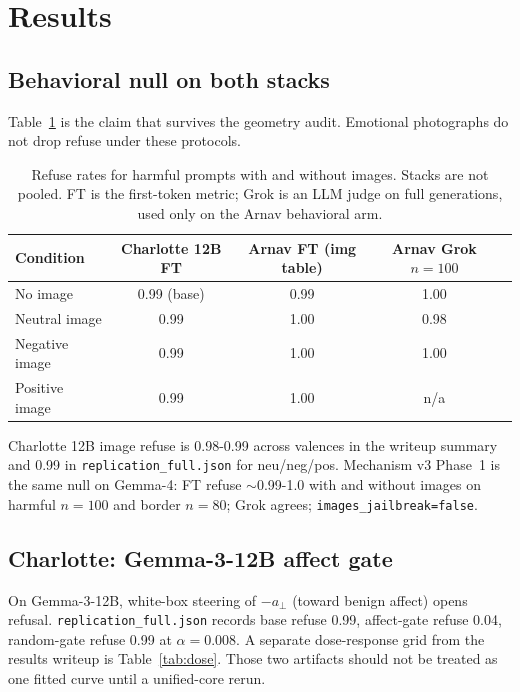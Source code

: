 \documentclass{article}
\begin{document}
\section{Results}
\label{sec:results}

\subsection{Behavioral null on both stacks}
\label{sec:null}

Table~\ref{tab:null} is the claim that survives the geometry audit. Emotional photographs do not drop refuse under these protocols.

\begin{table}[t]
\caption{Refuse rates for harmful prompts with and without images. Stacks are not pooled. FT is the first-token metric; Grok is an LLM judge on full generations, used only on the Arnav behavioral arm.}
\label{tab:null}
\centering
\small
\begin{tabular}{@{}lcccc@{}}
\toprule
Condition & Charlotte 12B FT & Arnav FT (img table) & Arnav Grok $n=100$ \\
\midrule
No image & 0.99 (base) & 0.99 & 1.00 \\
Neutral image & 0.99 & 1.00 & 0.98 \\
Negative image & 0.99 & 1.00 & 1.00 \\
Positive image & 0.99 & 1.00 & n/a \\
\bottomrule
\end{tabular}
\end{table}

Charlotte 12B image refuse is 0.98-0.99 across valences in the writeup summary and 0.99 in \texttt{replication\_full.json} for neu/neg/pos. Mechanism v3 Phase~1 is the same null on Gemma-4: FT refuse $\sim$0.99-1.0 with and without images on harmful $n=100$ and border $n=80$; Grok agrees; \texttt{images\_jailbreak=false}.

\subsection{Charlotte: Gemma-3-12B affect gate}
\label{sec:charlotte}

On Gemma-3-12B, white-box steering of $-a_\perp$ (toward benign affect) opens refusal. \texttt{replication\_full.json} records base refuse 0.99, affect-gate refuse 0.04, random-gate refuse 0.99 at $\alpha=0.008$. A separate dose-response grid from the results writeup is Table~\ref{tab:dose}. Those two artifacts should not be treated as one fitted curve until a unified-core rerun.
\end{document}
